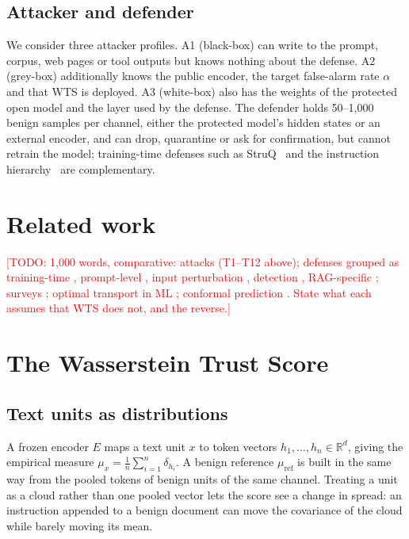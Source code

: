 \documentclass[review,12pt]{elsarticle}
\newcommand{\TODO}[1]{\textcolor{red}{[TODO: #1]}}
\begin{document}
\subsection{Attacker and defender}
We consider three attacker profiles. A1 (black-box) can write to the prompt, corpus, web pages or tool
outputs but knows nothing about the defense. A2 (grey-box) additionally knows the public encoder, the
target false-alarm rate $\alpha$ and that WTS is deployed. A3 (white-box) also has the weights of the
protected open model and the layer used by the defense. The defender holds 50--1{,}000 benign samples per
channel, either the protected model's hidden states or an external encoder, and can drop, quarantine or
ask for confirmation, but cannot retrain the model; training-time defenses such as StruQ~\cite{chen2024struq}
and the instruction hierarchy~\cite{wallace2024hierarchy} are complementary.

\section{Related work}\label{sec:related}
\TODO{1,000 words, comparative: attacks (T1--T12 above); defenses grouped as training-time
\cite{chen2024struq,wallace2024hierarchy}, prompt-level \cite{hines2024spotlighting}, input perturbation
\cite{robey2023smoothllm}, detection \cite{alon2023perplexity,inan2023llamaguard,liu2023formalizing,zou2025pishield},
RAG-specific \cite{xiang2024robustrag,choudhary2025stealth}; surveys \cite{yao2024survey,das2025security,deng2025agents};
optimal transport in ML \cite{montesuma2025ot}; conformal prediction \cite{angelopoulos2023conformal}.
State what each assumes that WTS does not, and the reverse.}

\section{The Wasserstein Trust Score}\label{sec:method}
\subsection{Text units as distributions}
A frozen encoder $E$ maps a text unit $x$ to token vectors $h_1,\dots,h_n\in\mathbb{R}^d$, giving the
empirical measure $\mu_x=\frac1n\sum_{i=1}^n\delta_{h_i}$. A benign reference $\mu_{\mathrm{ref}}$ is built
in the same way from the pooled tokens of benign units of the same channel. Treating a unit as a cloud
rather than one pooled vector lets the score see a change in spread: an instruction appended to a benign
document can move the covariance of the cloud while barely moving its mean.
\end{document}
